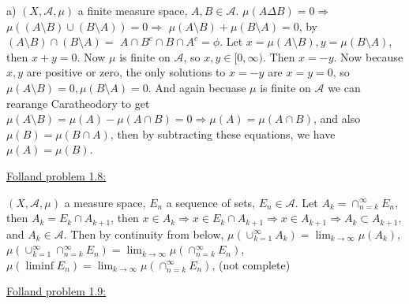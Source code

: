 \documentclass[12pt]{article}
\begin{document}
\begin{flushleft}
a) $(X,\mathcal{A},\mu)$ a finite measure space, $A,B \in \mathcal{A}$. 
$\mu( A \Delta B) = 0  \Rightarrow $ 
$\mu( (A \setminus B) \cup (B \setminus A) ) = 0  \Rightarrow $ 
$\mu( A \setminus B ) +\mu( B \setminus A )=0 $, by $(A \setminus B) \cap (B \setminus A) = $
$A \cap B^c \cap B \cap A^c = \phi$. Let $x = \mu( A \setminus B ), y = \mu( B \setminus A )$, then $x+y=0$. Now $\mu$ is finite on $\mathcal{A}$, so $x,y \in [0,\infty)$. Then $x=-y$. Now because $x,y$ are positive or zero, the only solutions to $x=-y$ are $x=y=0$, so $\mu( A \setminus B )=0, \mu( B \setminus A )=0$. And again becuase $\mu$ is finite on $\mathcal{A}$ we can rearange Caratheodory to get $\mu(A \setminus B) = \mu(A) - \mu(A \cap B) = 0 \Rightarrow \mu(A) = \mu(A \cap B)$, and also $\mu(B) = \mu(B \cap A)$, then by subtracting these equations, we have $\mu(A) = \mu(B)$.
\end{flushleft}


\begin{flushleft}
\underline{Folland problem 1.8:}
\end{flushleft}

\begin{flushleft}
$(X,\mathcal{A},\mu)$ a measure space, $E_n$ a sequence of sets, $E_n \in \mathcal{A}$. Let $A_k = \cap_{n=k}^{\infty} E_n$, then $A_k = E_k \cap A_{k+1}$, then $x \in A_k \Rightarrow x \in E_k \cap A_{k+1} \Rightarrow x \in A_{k+1} \Rightarrow A_k \subset A_{k+1}$, and $A_k \in \mathcal{A}$. Then by continuity from below, $\mu \left( \cup_{k=1}^\infty A_k \right) = \lim_{k \rightarrow \infty} \mu (A_k)$, $\mu \left( \cup_{k=1}^\infty \cap_{n=k}^{\infty} E_n \right) = \lim_{k \rightarrow \infty} \mu (\cap_{n=k}^{\infty} E_n)$, 
$\mu \left( \liminf E_n \right) = \lim_{k \rightarrow \infty} \mu (\cap_{n=k}^{\infty} E_n)$, 
(not complete)
\end{flushleft}





\begin{flushleft}
\underline{Folland problem 1.9:}
\end{flushleft}
\end{document}
